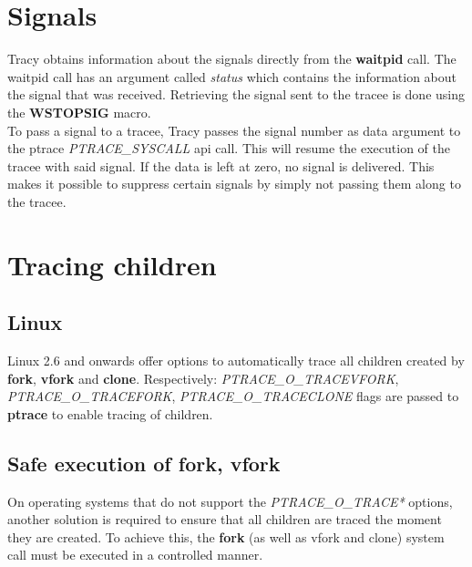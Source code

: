 \documentclass[a4paper, 10pt]{report}
\begin{document}

\section{Signals}

Tracy obtains information about the signals directly from the
\textbf{waitpid} call. The waitpid call has an argument called
\textit{status} which contains the information about the signal that was
received. Retrieving the signal sent to the tracee is done using the
\textbf{WSTOPSIG} macro. \\

To pass a signal to a tracee, Tracy passes the signal number as data
argument to the ptrace \textit{PTRACE\_SYSCALL} api call. This will
resume the execution of the tracee with said signal. If the data is
left at zero, no signal is delivered. This makes it possible to
suppress certain signals by simply not passing them along to the tracee.


\section{Tracing children}


\subsection{Linux}

Linux 2.6 and onwards offer options to automatically trace all children
created by \textbf{fork}, \textbf{vfork} and \textbf{clone}.
Respectively: \textit{PTRACE\_O\_TRACEVFORK}, \textit{PTRACE\_O\_TRACEFORK},
\textit{PTRACE\_O\_TRACECLONE} flags are passed to \textbf{ptrace} to enable
tracing of children.

\subsection{Safe execution of fork, vfork}
\label{safe-fork}

On operating systems that do not support the \textit{PTRACE\_O\_TRACE*} options,
another solution is required to ensure that all children are traced the moment
they are created. To achieve this, the \textbf{fork}
(as well as vfork and clone) system call must be executed in a
controlled manner.
\end{document}
